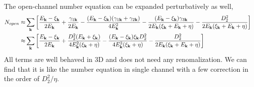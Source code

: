 
The open-channel number equation  can be expanded perturbatively as well, \begin{equation}
\begin{split}
N_{open}\approx&\sum_{\mathbf{k}}\left[\frac{E_{\mathbf{k}}-\xi_{\mathbf{k}}}{2E_{\mathbf{k}}}+\frac{\gamma_{1\mathbf{k}}}{2E_{\mathbf{k}}}
	-\frac{(E_{\mathbf{k}}-\xi_{\mathbf{k}})(\gamma_{1\mathbf{k}}+\gamma_{2\mathbf{k}})}{4E_{\mathbf{k}}^2}
	-\frac{(E_{\mathbf{k}}-\xi_{\mathbf{k}})\gamma_{3\mathbf{k}}}{2E_{\mathbf{k}}(\xi_{\mathbf{k}}+E_{\mathbf{k}}+\eta)}
	-\frac{D_{2}^{2}}{2E_{\mathbf{k}}(\xi_{\mathbf{k}}+E_{\mathbf{k}}+\eta)}\right]\\
	\approx&\sum_{\mathbf{k}}\left[\frac{E_{\mathbf{k}}-\xi_{\mathbf{k}}}{2E_{\mathbf{k}}}+\frac{{D_{2}^{2}(E_{\mathbf{k}}+\xi_{\mathbf{k}})}}{4E_{\mathbf{k}}^{2}(\xi_{\mathbf{k}}+\eta)}
	-\frac{(E_{\mathbf{k}}-\xi_{\mathbf{k}})\xi_{\mathbf{k}}D_{2}^{2}}{4E_{\mathbf{k}}^3(\xi_{\mathbf{k}}+\eta)}
	-\frac{D_{2}^{2}}{2E_{\mathbf{k}}(\xi_{\mathbf{k}}+E_{\mathbf{k}}+\eta)}\right]	
\end{split}
\end{equation}
All terms are well behaved in 3D and does not need any renomalization.   We can find that it is like the number equation in single channel with  a few correction in the order of $D_2^2/\eta$.  

%

